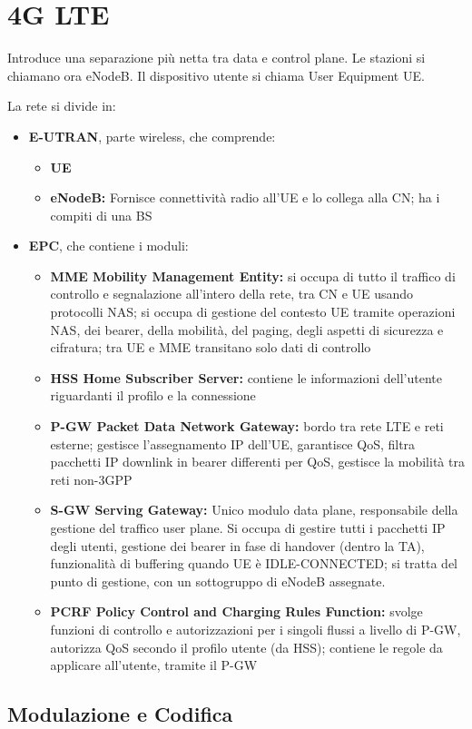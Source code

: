 \section{4G LTE}

Introduce una separazione più netta tra data e control plane. Le stazioni si chiamano ora eNodeB. Il dispositivo utente si chiama User Equipment UE.

La rete si divide in: 
\begin{itemize}
    \item \textbf{E-UTRAN}, parte wireless, che comprende:
    \begin{itemize}
        \item \textbf{UE}
        
        \item \textbf{eNodeB:} Fornisce connettività radio all'UE e lo collega alla CN; ha i compiti di una BS
    \end{itemize}
    
    \item \textbf{EPC}, che contiene i moduli: 
    \begin{itemize}
        \item \textbf{MME Mobility Management Entity:} si occupa di tutto il traffico di controllo e segnalazione all'intero della rete, tra CN e UE usando protocolli NAS; si occupa di gestione del contesto UE tramite operazioni NAS, dei bearer, della mobilità, del paging, degli aspetti di sicurezza e cifratura; tra UE e MME transitano solo dati di controllo
        
        \item \textbf{HSS Home Subscriber Server:} contiene le informazioni dell'utente riguardanti il profilo e la connessione
        
        \item \textbf{P-GW Packet Data Network Gateway:} bordo tra rete LTE e reti esterne; gestisce l'assegnamento IP dell'UE, garantisce QoS, filtra pacchetti IP downlink in bearer differenti per QoS, gestisce la mobilità tra reti non-3GPP
        
        \item \textbf{S-GW Serving Gateway:} Unico modulo data plane, responsabile della gestione del traffico user plane. Si occupa di gestire tutti i pacchetti IP degli utenti, gestione dei bearer in fase di handover (dentro la TA), funzionalità di buffering quando UE è IDLE-CONNECTED; si tratta del punto di gestione, con un sottogruppo di eNodeB assegnate.
        
        \item \textbf{PCRF Policy Control and Charging Rules Function:} svolge funzioni di controllo e autorizzazioni per i singoli flussi a livello di P-GW, autorizza QoS secondo il profilo utente (da HSS); contiene le regole da applicare all'utente, tramite il P-GW
    \end{itemize}
\end{itemize}

\subsection{Modulazione e Codifica}

